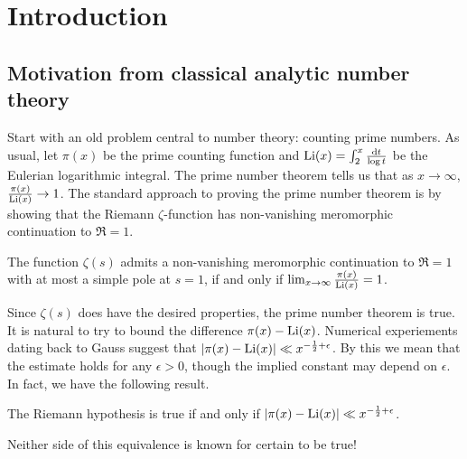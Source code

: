
\chapter{Introduction}





\section{Motivation from classical analytic number theory}

Start with an old problem central to number theory: counting 
prime numbers. As usual, let $\pi(x)$ be the prime counting function and 
$\operatorname{Li}(x) = \int_2^x \frac{\mathrm{d} t}{\log t}$ be the Eulerian logarithmic integral. 
The prime number theorem tells us that as $x\to \infty$, 
$\frac{\pi(x)}{\operatorname{Li}(x)} \to 1$. The standard approach 
to proving the prime number theorem is by showing that the Riemann 
$\zeta$-function has non-vanishing meromorphic continuation to $\Re = 1$.

\begin{theorem}
The function $\zeta(s)$ admits a non-vanishing meromorphic continuation to 
$\Re = 1$ with at most a simple pole at $s=1$, if and only if 
$\lim_{x\to \infty} \frac{\pi(x)}{\operatorname{Li}(x)} = 1$. 
\end{theorem}

Since $\zeta(s)$ does have the desired properties, the prime number 
theorem is true. It is natural to try to bound the difference 
$\pi(x) - \operatorname{Li}(x)$. Numerical experiements dating back to Gauss suggest that 
$|\pi(x) - \operatorname{Li}(x)| \ll x^{-\frac 1 2+\epsilon}$. By this we mean that the 
estimate holds for any $\epsilon>0$, though the implied constant may depend on 
$\epsilon$. In fact, we have the following result. 

\begin{theorem}
The Riemann hypothesis is true if and only if 
$|\pi(x) - \operatorname{Li}(x)| \ll x^{-\frac 1 2+\epsilon}$. 
\end{theorem}

Neither side of this equivalence is known for certain to be true! 


